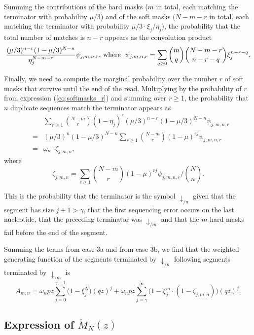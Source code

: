 \documentclass{article}
\begin{document}
Summing the contributions of the hard masks ($m$ in total, each matching
the terminator with probability $\mu/3$) and of the soft masks ($N-m-r$ in
total, each matching the terminator with probability
$\mu/3\cdot\xi_j/\eta_j$), the probability that the total number of
matches is $n-r$ appears as the convolution product
\begin{equation*}
\frac{(\mu/3)^{n-r}(1-\mu/3)^{N-n}}{\eta_j^{N-m-r}}
\psi_{j,m,n,r}\text{, where \;}
\psi_{j,m,n,r} = \sum_{q \geq 0}{m \choose q}{N-m-r \choose n-r-q}
\xi_j^{n-r-q}.
\end{equation*}

Finally, we need to compute the marginal probability over the number $r$
of soft masks that survive until the end of the read. Multiplying by the
probability of $r$ from expression (\ref{eq:softmasks_r}) and summing over
$r \geq 1$, the probability that $n$ duplicate sequences match the
terminator appears as
\begin{eqnarray*}
&\;& \sum_{r\geq1} {N-m \choose r}
(1 - \eta_j)^r (\mu/3)^{n-r} (1-\mu/3)^{N-n} \psi_{j,m,n,r} \\
&=& (\mu/3)^n(1-\mu/3)^{N-n} \sum_{r\geq1} {N-m \choose r}
  (1 - \mu)^{rj} \psi_{j,m,n,r} \\
&=& \omega_n \cdot \zeta_{j,m,n},
\end{eqnarray*}
where
\begin{equation}
\label{eq:zeta}
\zeta_{j,m,n} = \sum_{r\geq1} {N-m \choose r}
(1-\mu)^{rj} \psi_{j,m,n,r} \bigg/ {N \choose n}.
\end{equation}

This is the probability that the terminator is the symbol
$\downarrow_{/n}$ given that the segment has size $j+1 > \gamma$, that
the first sequencing error occurs on the last nucleotide, that the
preceding terminator was $\downarrow_{/m}$ and that the $m$ hard masks
fail before the end of the segment.

Summing the terms from case 3a and from case 3b, we find that the weighted
generating function of the segments terminated by $\downarrow_{/n}$
following segments terminated by $\downarrow_{/m}$ is
\begin{equation}
\label{eq:A}
A_{m,n} =
\omega_n pz \sum_{j=0}^{\gamma-1} \Big(1 - \xi_j^N \Big) (qz)^j + \omega_n
pz \sum_{j=\gamma}^\infty \Big(1 - \xi_j^m \cdot
(1- \zeta_{j,m,n}) \Big) (qz)^j.
\end{equation}

\subsection{Expression of $\mathring{M}_N(z)$}
\label{sec:expression_of_M}
\end{document}
